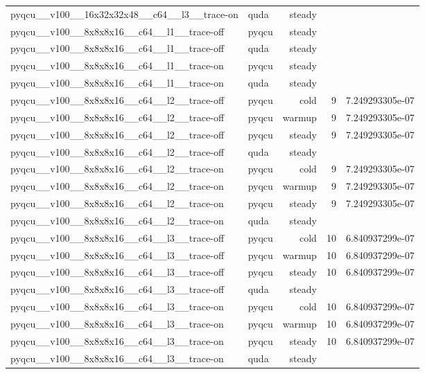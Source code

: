 \begin{table}[htbp]
\begin{tabular}{@{}llrrr@{}}
pyqcu\_\_v100\_\_16x32x32x48\_\_c64\_\_l3\_\_trace-on & quda & steady &  &  \\
pyqcu\_\_v100\_\_8x8x8x16\_\_c64\_\_l1\_\_trace-off & pyqcu & steady &  &  \\
pyqcu\_\_v100\_\_8x8x8x16\_\_c64\_\_l1\_\_trace-off & quda & steady &  &  \\
pyqcu\_\_v100\_\_8x8x8x16\_\_c64\_\_l1\_\_trace-on & pyqcu & steady &  &  \\
pyqcu\_\_v100\_\_8x8x8x16\_\_c64\_\_l1\_\_trace-on & quda & steady &  &  \\
pyqcu\_\_v100\_\_8x8x8x16\_\_c64\_\_l2\_\_trace-off & pyqcu & cold & 9 & 7.249293305e-07 \\
pyqcu\_\_v100\_\_8x8x8x16\_\_c64\_\_l2\_\_trace-off & pyqcu & warmup & 9 & 7.249293305e-07 \\
pyqcu\_\_v100\_\_8x8x8x16\_\_c64\_\_l2\_\_trace-off & pyqcu & steady & 9 & 7.249293305e-07 \\
pyqcu\_\_v100\_\_8x8x8x16\_\_c64\_\_l2\_\_trace-off & quda & steady &  &  \\
pyqcu\_\_v100\_\_8x8x8x16\_\_c64\_\_l2\_\_trace-on & pyqcu & cold & 9 & 7.249293305e-07 \\
pyqcu\_\_v100\_\_8x8x8x16\_\_c64\_\_l2\_\_trace-on & pyqcu & warmup & 9 & 7.249293305e-07 \\
pyqcu\_\_v100\_\_8x8x8x16\_\_c64\_\_l2\_\_trace-on & pyqcu & steady & 9 & 7.249293305e-07 \\
pyqcu\_\_v100\_\_8x8x8x16\_\_c64\_\_l2\_\_trace-on & quda & steady &  &  \\
pyqcu\_\_v100\_\_8x8x8x16\_\_c64\_\_l3\_\_trace-off & pyqcu & cold & 10 & 6.840937299e-07 \\
pyqcu\_\_v100\_\_8x8x8x16\_\_c64\_\_l3\_\_trace-off & pyqcu & warmup & 10 & 6.840937299e-07 \\
pyqcu\_\_v100\_\_8x8x8x16\_\_c64\_\_l3\_\_trace-off & pyqcu & steady & 10 & 6.840937299e-07 \\
pyqcu\_\_v100\_\_8x8x8x16\_\_c64\_\_l3\_\_trace-off & quda & steady &  &  \\
pyqcu\_\_v100\_\_8x8x8x16\_\_c64\_\_l3\_\_trace-on & pyqcu & cold & 10 & 6.840937299e-07 \\
pyqcu\_\_v100\_\_8x8x8x16\_\_c64\_\_l3\_\_trace-on & pyqcu & warmup & 10 & 6.840937299e-07 \\
pyqcu\_\_v100\_\_8x8x8x16\_\_c64\_\_l3\_\_trace-on & pyqcu & steady & 10 & 6.840937299e-07 \\
pyqcu\_\_v100\_\_8x8x8x16\_\_c64\_\_l3\_\_trace-on & quda & steady &  &  \\

\end{tabular}
\end{table}
